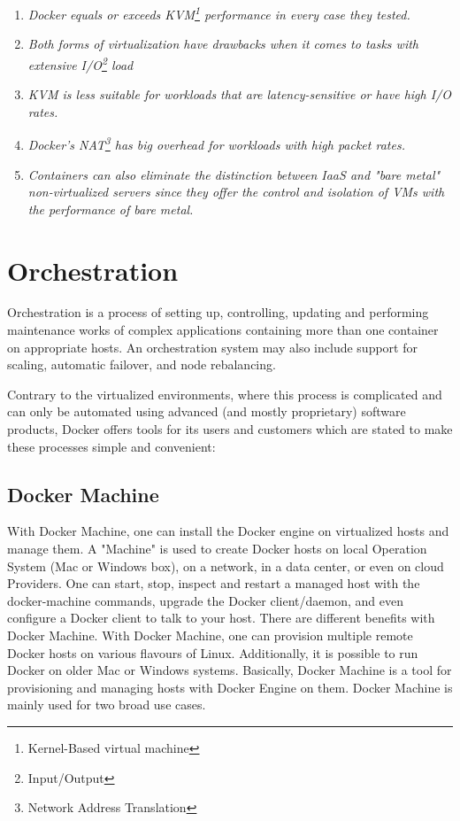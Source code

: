 \begin{enumerate}
\item \textit{Docker equals or
exceeds KVM\footnote{Kernel-Based virtual machine}
performance in every case they tested.}
\item \textit{Both forms of virtualization have drawbacks
when it comes to tasks with
extensive I/O\footnote{Input/Output} load}
\item \textit{KVM is less suitable for workloads that are latency-sensitive
or have high I/O rates.}
\item \textit{Docker's NAT\footnote{Network Address Translation}
has big overhead
for workloads with high packet rates.}
\item \textit{Containers can also eliminate the distinction between
IaaS and "bare metal" non-virtualized servers since
they offer the control and isolation of VMs
with the performance of bare metal.}
\end{enumerate}

\section{Orchestration}

\begin{definition}
Orchestration is a process of setting up, controlling, updating
and performing maintenance works of complex applications containing more than
one container on appropriate hosts. An orchestration system may also include support for scaling,
automatic failover, and node rebalancing\cite{AdrMouOrchestration:2016}.
\end{definition}

Contrary to the virtualized environments, where this
process is complicated and can only be automated using advanced (and mostly
proprietary) software products, Docker offers tools for its users and customers
which are stated to make these processes simple and convenient:

\subsection{Docker Machine}

With Docker Machine, one can install the Docker engine on virtualized
hosts and manage them. A "Machine" is used to create Docker
hosts on local Operation System (Mac or Windows box), on a
network, in a data center, or even on cloud Providers.
One can start, stop, inspect and restart a managed host
with the docker-machine commands, upgrade the Docker client/daemon, and
even configure a Docker client to talk to your host. There are different
benefits with Docker Machine. With Docker Machine, one can provision
multiple remote Docker hosts on various flavours of Linux.
Additionally, it is possible to run Docker on older Mac or Windows systems.
Basically, Docker Machine is a tool for provisioning and
managing hosts with Docker Engine on them\cite{DockerMachine}.
Docker Machine is mainly used for two broad use cases.

